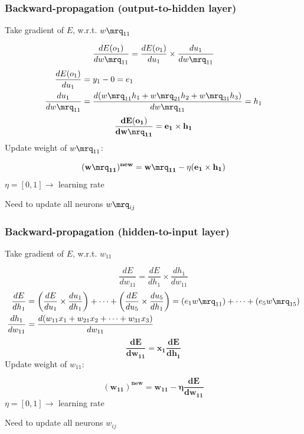 \documentclass{beamer}   %
\begin{document}
\begin{frame}[t]
\frametitle{Backward-propagation (output-to-hidden layer)}
    Take gradient of $E$, w.r.t. $w\mrq_{11}$ \par
    $$\frac{dE(o_1)}{dw\mrq_{11}} = \frac{dE(o_1)}{du_1} \times \frac{du_1}{dw\mrq_{11}}$$
    \vspace{-1em}
    \begin{align*}
        \frac{dE(o_1)}{du_1} &= y_1 - 0 = e_1 \\
        \frac{du_1}{dw\mrq_{11}} &= \frac{d(w\mrq_{11}h_1 + w\mrq_{21}h_2 + w\mrq_{31}h_3)}{dw\mrq_{11}} = h_1
    \end{align*}
    $$\mathbf{\frac{dE(o_1)}{dw\mrq_{11}} = e_1 \times h_1}$$ 
    Update weight of $w\mrq_{11}$: \par
    \vspace{-1em}
    $$\mathbf{(w\mrq_{11})^{new} = w\mrq_{11} - \eta(e_1 \times h_1)}$$
    $\eta = [0,1] \rightarrow$ learning rate \par
    Need to update all neurons $w\mrq_{ij}$ \par 
\end{frame}


\begin{frame}[t]
\frametitle{Backward-propagation (hidden-to-input layer)}
    Take gradient of $E$, w.r.t. $w_{11}$ \par
    $$\frac{dE}{dw_{11}} = \frac{dE}{dh_1} \times \frac{dh_1}{dw_{11}}$$
    \vspace{-1em}
    \begin{align*}
        \frac{dE}{dh_1} &= \left(\frac{dE}{du_1} \times \frac{du_1}{dh_1}\right) + \dots + \left(\frac{dE}{du_5} \times \frac{du_5}{dh_1}\right)
        = (e_1w\mrq_{11}) + \dots + (e_5w\mrq_{15}) \\
        \frac{dh_1}{dw_{11}} &= \frac{d(w_{11}x_1 + w_{21}x_2 + \dots + w_{31}x_3)}{dw_{11}}
    \end{align*}
    $$\mathbf{\frac{dE}{dw_{11}} = x_1\frac{dE}{dh_1}}$$ 
    Update weight of $w_{11}$: \par
    \vspace{-1em}
    $$\mathbf{(w_{11})^{new} = w_{11} - \eta\frac{dE}{dw_{11}}}$$
    $\eta = [0,1] \rightarrow$ learning rate \par
    Need to update all neurons $w_{ij}$ \par 
\end{frame}
\end{document}
